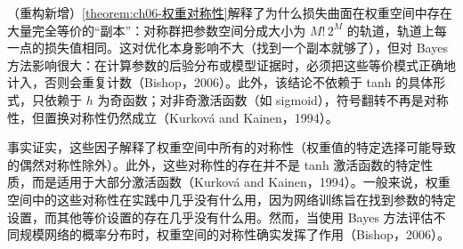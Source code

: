 \documentclass[../../main.tex]{subfiles}
\begin{document}
\begin{remark}（重构新增）\cref{theorem:ch06-权重对称性}解释了为什么损失曲面在权重空间中存在大量完全等价的“副本”：对称群把参数空间分成大小为 $M!\,2^{M}$ 的轨道，轨道上每一点的损失值相同。这对优化本身影响不大（找到一个副本就够了），但对 Bayes 方法影响很大：在计算参数的后验分布或模型证据时，必须把这些等价模式正确地计入，否则会重复计数（Bishop，2006）。此外，该结论不依赖于 tanh 的具体形式，只依赖于 $h$ 为奇函数；对非奇激活函数（如 sigmoid），符号翻转不再是对称性，但置换对称性仍然成立（Kurková and Kainen，1994）。
\end{remark}

事实证实，这些因子解释了权重空间中所有的对称性（权重值的特定选择可能导致的偶然对称性除外）。此外，这些对称性的存在并不是 tanh 激活函数的特定性质，而是适用于大部分激活函数（Kurková and Kainen，1994）。一般来说，权重空间中的这些对称性在实践中几乎没有什么用，因为网络训练旨在找到参数的特定设置，而其他等价设置的存在几乎没有什么用。然而，当使用 Bayes 方法评估不同规模网络的概率分布时，权重空间的对称性确实发挥了作用（Bishop，2006）。
\end{document}
